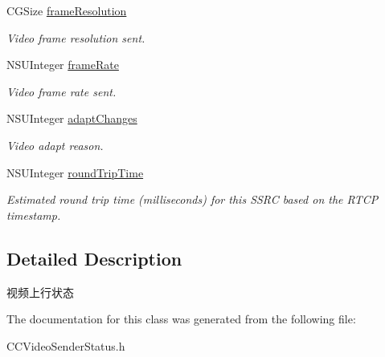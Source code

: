 \begin{DoxyCompactItemize}
\mbox{\label{interface_c_c_video_sender_status_af8b1750e2d9abd4bc6f0778889e447c3}} 
C\+G\+Size \hyperlink{interface_c_c_video_sender_status_af8b1750e2d9abd4bc6f0778889e447c3}{frame\+Resolution}
\begin{DoxyCompactList}\small\item\em Video frame resolution sent. \end{DoxyCompactList}\item 
\mbox{\label{interface_c_c_video_sender_status_a2652c07d56b5a91c5d4f3fbc910fcaa9}} 
N\+S\+U\+Integer \hyperlink{interface_c_c_video_sender_status_a2652c07d56b5a91c5d4f3fbc910fcaa9}{frame\+Rate}
\begin{DoxyCompactList}\small\item\em Video frame rate sent. \end{DoxyCompactList}\item 
\mbox{\label{interface_c_c_video_sender_status_a7506ad42692d9c188c1017e9cf4c97df}} 
N\+S\+U\+Integer \hyperlink{interface_c_c_video_sender_status_a7506ad42692d9c188c1017e9cf4c97df}{adapt\+Changes}
\begin{DoxyCompactList}\small\item\em Video adapt reason. \end{DoxyCompactList}\item 
\mbox{\label{interface_c_c_video_sender_status_ad10aa0e7a1a3e3c88577f19751158a74}} 
N\+S\+U\+Integer \hyperlink{interface_c_c_video_sender_status_ad10aa0e7a1a3e3c88577f19751158a74}{round\+Trip\+Time}
\begin{DoxyCompactList}\small\item\em Estimated round trip time (milliseconds) for this S\+S\+RC based on the R\+T\+CP timestamp. \end{DoxyCompactList}\end{DoxyCompactItemize}


\subsection{Detailed Description}
视频上行状态 

The documentation for this class was generated from the following file\+:\begin{DoxyCompactItemize}
\item 
C\+C\+Video\+Sender\+Status.\+h\end{DoxyCompactItemize}
